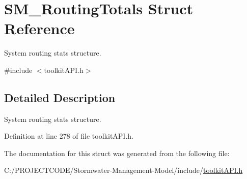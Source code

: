 \hypertarget{struct_s_m___routing_totals}{}\section{S\+M\+\_\+\+Routing\+Totals Struct Reference}
\label{struct_s_m___routing_totals}


System routing stats structure.  




{\ttfamily \#include $<$toolkit\+A\+P\+I.\+h$>$}



\subsection{Detailed Description}
System routing stats structure. 

Definition at line 278 of file toolkit\+A\+P\+I.\+h.



The documentation for this struct was generated from the following file\+:\begin{DoxyCompactItemize}
\item 
C\+:/\+P\+R\+O\+J\+E\+C\+T\+C\+O\+D\+E/\+Stormwater-\/\+Management-\/\+Model/include/\hyperlink{toolkit_a_p_i_8h}{toolkit\+A\+P\+I.\+h}\end{DoxyCompactItemize}
